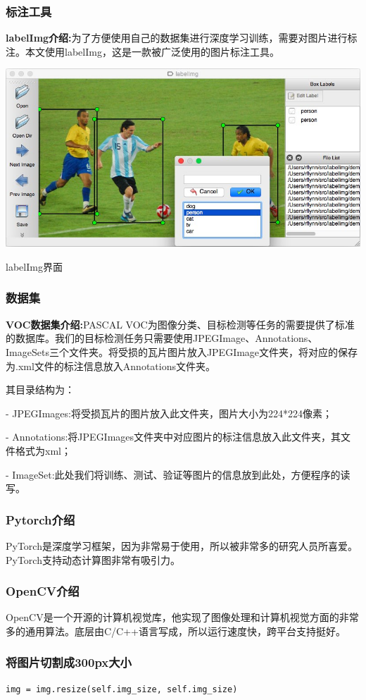 \subsubsection{标注工具}
\textbf{labelImg介绍:}为了方便使用自己的数据集进行深度学习训练，需要对图片进行标注。本文使用labelImg，这是一款被广泛使用的图片标注工具。
\begin{uscfigure}
	\includegraphics[width=\textwidth]{./Pictures/labelimg.jpg}	
	\caption{labelImg界面}
\end{uscfigure}
\subsubsection{数据集}
\textbf{VOC数据集介绍:}PASCAL VOC为图像分类、目标检测等任务的需要提供了标准的数据库。我们的目标检测任务只需要使用JPEGImage、Annotations、ImageSets三个文件夹。将受损的瓦片图片放入JPEGImage文件夹，将对应的保存为.xml文件的标注信息放入Annotations文件夹。

其目录结构为：

- JPEGImages:将受损瓦片的图片放入此文件夹，图片大小为224*224像素；

- Annotations:将JPEGImages文件夹中对应图片的标注信息放入此文件夹，其文件格式为xml；

- ImageSet:此处我们将训练、测试、验证等图片的信息放到此处，方便程序的读写。


\subsubsection{Pytorch介绍}
PyTorch是深度学习框架，因为非常易于使用，所以被非常多的研究人员所喜爱。PyTorch支持动态计算图非常有吸引力。
\subsubsection{OpenCV介绍}
OpenCV是一个开源的计算机视觉库，他实现了图像处理和计算机视觉方面的非常多的通用算法。底层由C/C++语言写成，所以运行速度快，跨平台支持挺好。
\subsubsection{将图片切割成300px大小}
\begin{lstlisting}[caption={图像切割}]
img = img.resize(self.img_size, self.img_size)
\end{lstlisting}